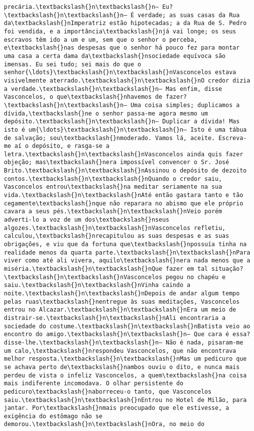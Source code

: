 \documentclass[11pt]{article}
\begin{document}
\begin{Verbatim}[commandchars=\\\{\}]
precária.\textbackslash{}n\textbackslash{}n— Eu?\textbackslash{}n\textbackslash{}n— É verdade; as suas casas da Rua da\textbackslash{}nImperatriz estão hipotecadas; a da Rua de S. Pedro foi vendida, e a importância\textbackslash{}njá vai longe; os seus escravos têm ido a um e um, sem que o senhor o perceba, e\textbackslash{}nas despesas que o senhor há pouco fez para montar uma casa a certa dama da\textbackslash{}nsociedade equívoca são imensas. Eu sei tudo; sei mais do que o senhor{\ldots}\textbackslash{}n\textbackslash{}nVasconcelos estava visivelmente aterrado.\textbackslash{}n\textbackslash{}nO credor dizia a verdade.\textbackslash{}n\textbackslash{}n— Mas enfim, disse Vasconcelos, o que\textbackslash{}nhavemos de fazer?\textbackslash{}n\textbackslash{}n— Uma coisa simples; duplicamos a dívida,\textbackslash{}ne o senhor passa-me agora mesmo um depósito.\textbackslash{}n\textbackslash{}n— Duplicar a dívida! Mas isto é um{\ldots}\textbackslash{}n\textbackslash{}n— Isto é uma tábua de salvação; sou\textbackslash{}nmoderado. Vamos lá, aceite. Escreva-me aí o depósito, e rasga-se a letra.\textbackslash{}n\textbackslash{}nVasconcelos ainda quis fazer objeção; mas\textbackslash{}nera impossível convencer o Sr. José Brito.\textbackslash{}n\textbackslash{}nAssinou o depósito de dezoito contos.\textbackslash{}n\textbackslash{}nQuando o credor saiu, Vasconcelos entrou\textbackslash{}na meditar seriamente na sua vida.\textbackslash{}n\textbackslash{}nAté então gastara tanto e tão cegamente\textbackslash{}nque não reparara no abismo que ele próprio cavara a seus pés.\textbackslash{}n\textbackslash{}nVeio porém adverti-lo a voz de um dos\textbackslash{}nseus algozes.\textbackslash{}n\textbackslash{}nVasconcelos refletiu, calculou,\textbackslash{}nrecapitulou as suas despesas e as suas obrigações, e viu que da fortuna que\textbackslash{}npossuía tinha na realidade menos da quarta parte.\textbackslash{}n\textbackslash{}nPara viver como até ali vivera, aquilo\textbackslash{}nera nada menos que a miséria.\textbackslash{}n\textbackslash{}nQue fazer em tal situação?\textbackslash{}n\textbackslash{}nVasconcelos pegou no chapéu e saiu.\textbackslash{}n\textbackslash{}nVinha caindo a noite.\textbackslash{}n\textbackslash{}nDepois de andar algum tempo pelas ruas\textbackslash{}nentregue às suas meditações, Vasconcelos entrou no Alcazar.\textbackslash{}n\textbackslash{}nEra um meio de distrair-se.\textbackslash{}n\textbackslash{}nAli encontraria a sociedade do costume.\textbackslash{}n\textbackslash{}nBatista veio ao encontro do amigo.\textbackslash{}n\textbackslash{}n— Que cara é essa? disse-lhe.\textbackslash{}n\textbackslash{}n— Não é nada, pisaram-me um calo,\textbackslash{}nrespondeu Vasconcelos, que não encontrava melhor resposta.\textbackslash{}n\textbackslash{}nMas um pedicuro que se achava perto de\textbackslash{}nambos ouviu o dito, e nunca mais perdeu de vista o infeliz Vasconcelos, a quem\textbackslash{}na coisa mais indiferente incomodava. O olhar persistente do pedicuro\textbackslash{}naborreceu-o tanto, que Vasconcelos saiu.\textbackslash{}n\textbackslash{}nEntrou no Hotel de Milão, para jantar. Por\textbackslash{}nmais preocupado que ele estivesse, a exigência do estômago não se demorou.\textbackslash{}n\textbackslash{}nOra, no meio do 
\end{Verbatim}
\end{document}
